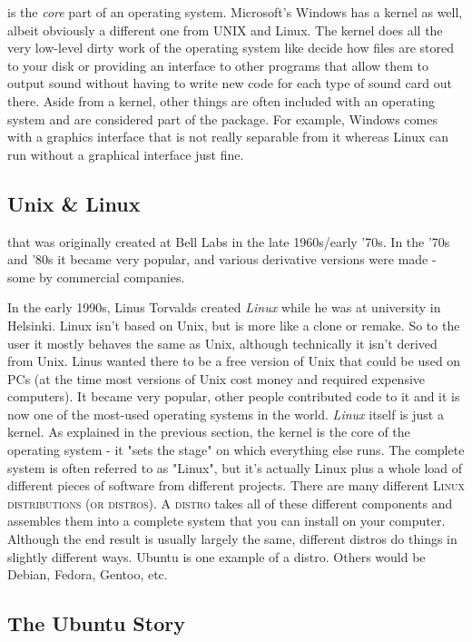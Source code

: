 \documentclass{tufte-book} %
\begin{document}
 is the \textit{core} part of an operating system. Microsoft's Windows has a kernel as well, albeit obviously a different one from UNIX and Linux. The kernel does all the very low-level dirty work of the operating system like decide how files are stored to your disk or providing an interface to other programs that allow them to output sound without having to write new code for each type of sound card out there. Aside from a kernel, other things are often included with an operating system and are considered part of the package. For example, Windows comes with a graphics interface that is not really separable from it whereas Linux can run without a graphical interface just fine.

\subsection{Unix \& Linux}
 that was originally created at Bell Labs in the late 1960s/early '70s. In the '70s and '80s it became very popular, and various derivative versions were made - some by commercial companies.


In the early 1990s, Linus Torvalds created \textit{Linux} while he was at university in Helsinki. Linux isn't based on Unix, but is more like a clone or remake. So to the user it mostly behaves the same as Unix, although technically it isn't derived from Unix. Linus wanted there to be a free version of Unix that could be used on PCs (at the time most versions of Unix cost money and required expensive computers). It became very popular, other people contributed code to it and it is now one of the most-used operating systems in the world.
\textit{Linux} itself is just a kernel. As explained in the previous section, the kernel is the core of the operating system - it "sets the stage" on which everything else runs. The complete system is often referred to as "Linux", but it's actually Linux plus a whole load of different pieces of software from different projects.
There are many different \textsc{Linux distributions (or distros)}. A \textsc{distro} takes all of these different components and assembles them into a complete system that you can install on your computer. Although the end result is usually largely the same, different distros do things in slightly different ways. Ubuntu is one example of a distro. Others would be Debian, Fedora, Gentoo, etc.

\subsection[Ubuntu]{The Ubuntu Story}
\end{document}
